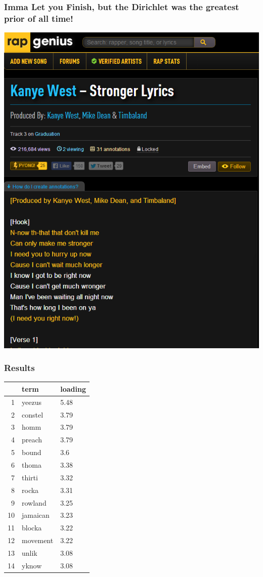 \documentclass[presentation]{beamer}
\begin{document}
\begin{frame}
\frametitle{Imma Let you Finish, but the Dirichlet was the greatest prior of all time!}
\pause
\begin{center}
\includegraphics[height=1.0\textheight]{Images/lyrics_sample.png}
\end{center}
\end{frame}

\begin{frame} 	
\frametitle{Results}
\pause
\begin{table}[ht]
\centering
\begin{tabular}{rll}
  \hline
 & term & loading \\ 
  \hline
1 & yeezus & 5.48 \\ 
  2 & constel & 3.79 \\ 
  3 & homm & 3.79 \\ 
  4 & preach & 3.79 \\ 
  5 & bound & 3.6 \\ 
  6 & thoma & 3.38 \\ 
  7 & thirti & 3.32 \\ 
  8 & rocka & 3.31 \\ 
  9 & rowland & 3.25 \\ 
  10 & jamaican & 3.23 \\ 
  11 & blocka & 3.22 \\ 
  12 & movement & 3.22 \\ 
  13 & unlik & 3.08 \\ 
  14 & yknow & 3.08 \\ 
   \hline
\end{tabular}
\end{table}
\end{frame}
\end{document}
